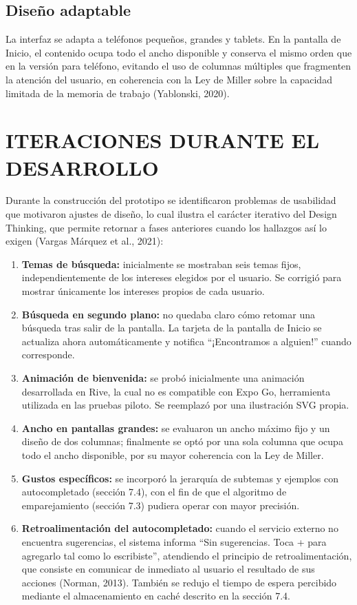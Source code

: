 \subsection{Diseño adaptable}
La interfaz se adapta a teléfonos pequeños, grandes y tablets. En la pantalla de Inicio, el contenido ocupa todo el ancho disponible y conserva el mismo orden que en la versión para teléfono, evitando el uso de columnas múltiples que fragmenten la atención del usuario, en coherencia con la Ley de Miller sobre la capacidad limitada de la memoria de trabajo (Yablonski, 2020).

\section{ITERACIONES DURANTE EL DESARROLLO}
Durante la construcción del prototipo se identificaron problemas de usabilidad que motivaron ajustes de diseño, lo cual ilustra el carácter iterativo del Design Thinking, que permite retornar a fases anteriores cuando los hallazgos así lo exigen (Vargas Márquez et al., 2021):

\begin{enumerate}
    \item \textbf{Temas de búsqueda:} inicialmente se mostraban seis temas fijos, independientemente de los intereses elegidos por el usuario. Se corrigió para mostrar únicamente los intereses propios de cada usuario.
    \item \textbf{Búsqueda en segundo plano:} no quedaba claro cómo retomar una búsqueda tras salir de la pantalla. La tarjeta de la pantalla de Inicio se actualiza ahora automáticamente y notifica ``¡Encontramos a alguien!'' cuando corresponde.
    \item \textbf{Animación de bienvenida:} se probó inicialmente una animación desarrollada en Rive, la cual no es compatible con Expo Go, herramienta utilizada en las pruebas piloto. Se reemplazó por una ilustración SVG propia.
    \item \textbf{Ancho en pantallas grandes:} se evaluaron un ancho máximo fijo y un diseño de dos columnas; finalmente se optó por una sola columna que ocupa todo el ancho disponible, por su mayor coherencia con la Ley de Miller.
    \item \textbf{Gustos específicos:} se incorporó la jerarquía de subtemas y ejemplos con autocompletado (sección 7.4), con el fin de que el algoritmo de emparejamiento (sección 7.3) pudiera operar con mayor precisión.
    \item \textbf{Retroalimentación del autocompletado:} cuando el servicio externo no encuentra sugerencias, el sistema informa ``Sin sugerencias. Toca + para agregarlo tal como lo escribiste'', atendiendo el principio de retroalimentación, que consiste en comunicar de inmediato al usuario el resultado de sus acciones (Norman, 2013). También se redujo el tiempo de espera percibido mediante el almacenamiento en caché descrito en la sección 7.4.
\end{enumerate}

